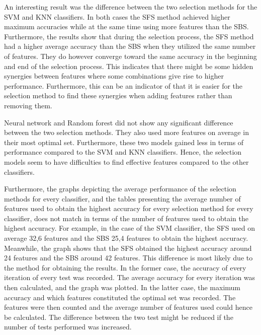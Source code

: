 \documentclass{kththesis}
\begin{document}
An interesting result was the difference between the two selection methods for the SVM and KNN classifiers. In both cases the SFS method achieved higher maximum accuracies while at the same time using more features than the SBS. Furthermore, the results  show that during the selection process, the SFS method had a higher average accuracy than the SBS when they utilized the same number of features. They do however converge toward the same accuracy in the beginning and end of the selection process. This indicates that there might be some hidden synergies between features where some combinations give rise to higher performance. Furthermore, this can be an indicator of that it is easier for the selection method to find these synergies when adding features rather than removing them.

Neural network and Random forest did not show any significant difference between the two selection methods. They also used more features on average in their most optimal set. Furthermore, these two models gained less in terms of performance compared to the SVM and KNN classifiers. Hence, the selection models seem to have difficulties to find effective features compared to the other classifiers.


Furthermore, the graphs depicting the average performance of the selection methods for every classifier, and the tables presenting the average number of features used to obtain the highest accuracy for every selection method for every classifier, does not match in terms of the number of features used to obtain the highest accuracy. %
For example, in the case of the SVM classifier, the SFS used on average 32,6 features and the SBS 25,4 features to obtain the highest accuracy. Meanwhile, the graph shows that the SFS obtained the highest accuracy around 24 features and the SBS around 42 features. This difference  is most likely due to the method for obtaining the results. In the former case, the accuracy of every iteration of every test was recorded. The average accuracy for every iteration was then calculated, and the graph was plotted. In the latter case, the maximum accuracy and which features constituted the optimal set was recorded. The features were then counted and the average number of features used could hence be calculated. The difference between the two test might be reduced if the number of tests performed was increased. 
\end{document}
